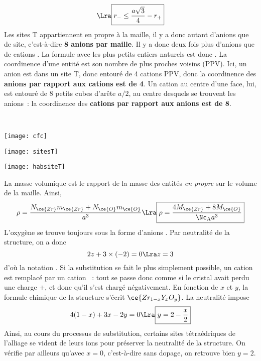 \documentclass[11pt]{book}
\begin{document}
{\begin{minipage}[t]{.73\linewidth}
\begin{enumerate}[start=2]
\[				\Lra
				\boxed{r_- \leq \frac{a \sqrt{3}}{4} - r_+}
			\]
			 Les sites T appartiennent en propre à la maille, il y a donc autant
			d'anions que de site, c'est-à-dire \textbf{8 anions par maille}.
			 Il y a donc deux fois plus d'anions  que de cations
			. La formule avec les plus petits entiers naturels est donc
			.
			 La coordinence d'une entité est son nombre de plus proches voisins
			(PPV). Ici, un anion est dans un site T, donc entouré de 4 cations PPV, donc
			la coordinence des \textbf{anions par rapport aux cations est de 4}. Un cation
			au centre d'une face, lui, est entouré de 8 petits cubes d'arête $a/2$, au
			centre desquels se trouvent les anions~: la coordinence des \textbf{cations
				par rapport aux anions est de 8}.
		\end{enumerate}
	\end{minipage}
	\hfill
	\begin{minipage}[t]{.25\linewidth}
		~
		\begin{center}
			\texttt{[image: cfc]}
			\label{fig:cfc}
		\end{center}
		\begin{center}
			\texttt{[image: sitesT]}
			\label{fig:sitesT}
		\end{center}
		\begin{center}
			\texttt{[image: habsiteT]}
			\label{fig:habsiteT}
		\end{center}
	\end{minipage}
	\begin{enumerate}[start=9]
		 La masse volumique est le rapport de la masse des entités \textit{en
			propre} sur le volume de la maille. Ainsi,
		\[
			\rho = \frac{N_{\ce{Zr}} m_{\ce{Zr}} + N_{\ce{O}} m_{\ce{O}}}{a^3}
			\Lra
			\boxed{\rho = \frac{4M_{\ce{Zr}} + 8M_{\ce{O}}}{\Nc_{\rm A}a^3}}
		\]
		 L'oxygène se trouve toujours sous la forme d'anions . Par
		neutralité de la structure, on a donc
		\[
			2z + 3 \times (-2) = 0
			\Lra
			z=3
		\]
		d'où la notation .
		 Si la substitution se fait le plus simplement possible, un cation
		 est remplacé par un cation ~: tout se passe donc comme
		si le cristal avait perdu une charge $+$, et donc qu'il s'est chargé
		négativement.
		 En fonction de $x$ et $y$, la formule chimique de la structure
		s'écrit $\ce{Zr_{1-x}Y_{x}O_{y}}$. La neutralité impose
		\[
			4(1-x) + 3x -2y = 0
			\Lra
			\boxed{y = 2 - \frac{x}{2}}
		\]
		Ainsi, au cours du processus de substitution, certains sites tétraédriques de
		l'alliage se vident de leurs ions  pour préserver la neutralité de
		la structure. On vérifie par ailleurs qu'avec $x=0$, c'est-à-dire sans dopage,
		on retrouve bien $y=2$.
	\end{enumerate}
}
\end{document}
